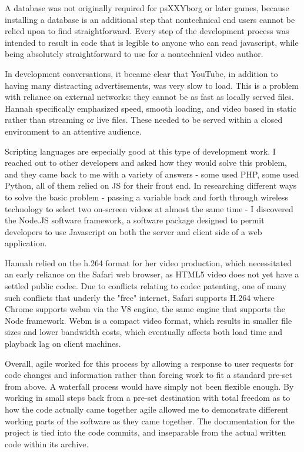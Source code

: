 A database was not originally required for psXXYborg or later games, because installing a database is an additional step that nontechnical end users cannot be relied upon to find straightforward. Every step of the development process was intended to result in code that is legible to anyone who can read javascript, while being absolutely straightforward to use for a nontechnical video author. 

In development conversations, it became clear that YouTube, in addition to having many distracting advertisements, was very slow to load. This is a problem with reliance on external networks: they cannot be as fast as locally served files. Hannah specifically emphasized speed, smooth loading, and video based in static rather than streaming or live files. These needed to be served within a closed environment to an attentive audience. 

Scripting languages are especially good at this type of development work. I reached out to other developers and asked how they would solve this problem, and they came back to me with a variety of answers - some used PHP, some used Python, all of them relied on JS for their front end. In researching different ways to solve the basic problem - passing a variable back and forth through wireless technology to select two on-screen videos at almost the same time - I discovered the Node.JS software framework, a software package designed to permit developers to use Javascript on both the server and client side of a web application. 

Hannah relied on the h.264 format for her video production, which necessitated an early reliance on the Safari web browser, as HTML5 video does not yet have a settled public codec. Due to conflicts relating to codec patenting, one of many such conflicts that underly the "free" internet, Safari supports H.264 where Chrome supports webm via the V8 engine, the same engine that supports the Node framework. Webm is a compact video format, which results in smaller file sizes and lower bandwidth costs, which eventually affects both load time and playback lag on client machines. 

Overall, agile worked for this process by allowing a response to user requests for code changes and information rather than forcing work to fit a standard pre-set from above. A waterfall process would have simply not been flexible enough. By working in small steps back from a pre-set destination with total freedom as to how the code actually came together agile allowed me to demonstrate different working parts of the software as they came together. The documentation for the project is tied into the code commits, and inseparable from the actual written code within its archive.

